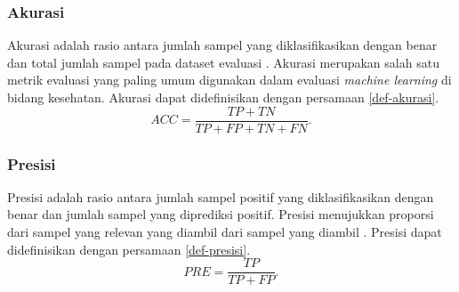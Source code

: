 \subsubsection{Akurasi}
\label{subsubsec: landasan-akurasi}
%
Akurasi adalah rasio antara jumlah sampel yang diklasifikasikan dengan benar dan total jumlah sampel pada dataset evaluasi \parencite{hicksEvaluationMetricsMedical2022}.
Akurasi merupakan salah satu metrik evaluasi yang paling umum digunakan dalam evaluasi \textit{machine learning} di bidang kesehatan.
Akurasi dapat didefinisikan dengan persamaan \ref{def-akurasi}.
\begin{equation}
    ACC = \frac{TP + TN}{TP + FP + TN + FN}.
    \label{def-akurasi}
\end{equation}

\subsubsection{Presisi}
\label{subsubsec: landasan-presisi}
Presisi adalah rasio antara jumlah sampel positif yang diklasifikasikan dengan benar dan jumlah sampel yang diprediksi positif.
Presisi menujukkan proporsi dari sampel yang relevan yang diambil dari sampel yang diambil \parencite{hicksEvaluationMetricsMedical2022}.
Presisi dapat didefinisikan dengan persamaan \ref{def-presisi}.
\begin{equation}
    PRE = \frac{TP}{TP + FP}.
    \label{def-presisi}
\end{equation}

